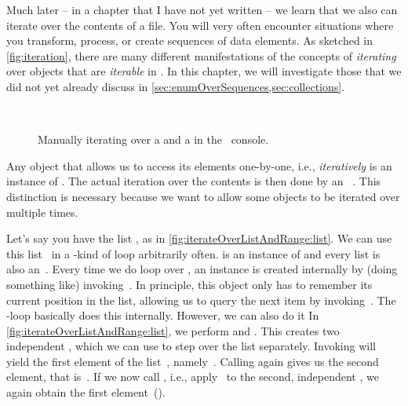 Much later -- in a chapter that I have not yet written -- we learn that we also can iterate over the contents of a file.
You will very often encounter situations where you transform, process, or create sequences of data elements.
As sketched in \cref{fig:iteration}, there are many different manifestations of the concepts of \emph{iterating} over objects that are \emph{iterable} in \python.
In this chapter, we will investigate those that we did not yet already discuss in \cref{sec:enumOverSequences,sec:collections}.
%
%
\label{sec:iterable}%
%
\begin{figure}%
\centering%
%
%
%
\\[12pt]%
%
%
%
%
\caption{Manually iterating over a  and a  in the \python~console.}%
\label{fig:iterateOverListAndRange}%
\end{figure}%
%
\begin{sloppypar}%
Any object that allows us to access its elements one-by-one, i.e., \emph{iteratively} is an instance of .
The actual iteration over the contents is then done by an ~\cite{PEP234}.
This distinction is necessary because we want to allow some objects to be iterated over multiple times.%
\end{sloppypar}%
%
Let's say you have the list , as in \cref{fig:iterateOverListAndRange:list}.
We can use this list~ in a -kind of loop arbitrarily often.
 is an instance of  and every list is also an~.
Every time we do loop over , an  instance is created internally by (doing something like) invoking~.
In principle, this  object only has to remember its current position in the list, allowing us to query the next item by invoking~.
The -loop basically does this internally.
However, we can also do it 
In \cref{fig:iterateOverListAndRange:list}, we perform  and .
This creates two independent , which we can use to step over the list separately.
Invoking  will yield the first element of the list~, namely~.
Calling  again gives us the second element, that is~.
If we now call , i.e., apply~ to the second, independent , we again obtain the first element~().

